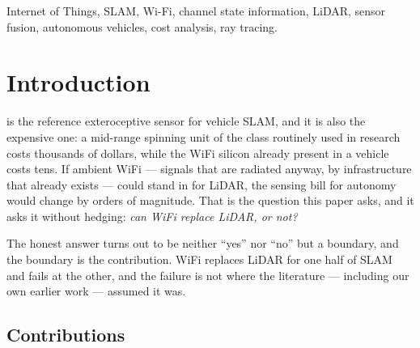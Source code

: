 \documentclass[journal]{IEEEtran}
\begin{document}
\begin{IEEEkeywords}
Internet of Things, SLAM, Wi-Fi, channel state information, LiDAR, sensor fusion,
autonomous vehicles, cost analysis, ray tracing.
\end{IEEEkeywords}

\section{Introduction}

 is the reference exteroceptive sensor for vehicle SLAM, and it is
also the expensive one: a mid-range spinning unit of the class routinely used in
research costs thousands of dollars, while the WiFi silicon already present in a
vehicle costs tens. If ambient WiFi --- signals that are radiated anyway, by
infrastructure that already exists --- could stand in for LiDAR, the sensing bill for
autonomy would change by orders of magnitude. That is the question this paper asks, and
it asks it without hedging: \emph{can WiFi replace LiDAR, or not?}

The honest answer turns out to be neither ``yes'' nor ``no'' but a boundary, and the
boundary is the contribution. WiFi replaces LiDAR for one half of SLAM and fails at the
other, and the failure is not where the literature --- including our own earlier work
\cite{fetna2026wifiradar} --- assumed it was.

\subsection{Contributions}
\end{document}
